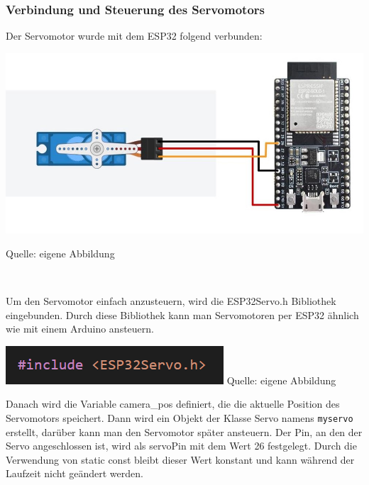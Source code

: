\documentclass[ngerman,12pt,a4paper]{article}
\begin{document}
				\subsubsection{Verbindung und Steuerung des Servomotors} %
				
				Der Servomotor wurde mit dem ESP32 folgend verbunden:
				
				\begin{center}
					\begin{minipage}[t]{\textwidth}
						\includegraphics[scale=0.6]{Pictures/servo_verkabelung}
						\label{fig:servo_verkabelung}
						\vspace{-10pt}
						\begin{center}
							\par\small Quelle: eigene Abbildung 
						\end{center}
					\end{minipage} \\[0.70cm]
				\end{center}
				
				\noindent
				Um den Servomotor einfach anzusteuern, wird die ESP32Servo.h Bibliothek eingebunden. Durch diese Bibliothek kann man Servomotoren per ESP32 ähnlich wie mit einem Arduino ansteuern.
				
				\begin{center}
					\begin{minipage}{0.7\textwidth}
						\centering
						\includegraphics[width=\textwidth]{Pictures/esp32servo}
						\label{fig:esp32sero}
						\vspace{5pt}
						{\small {Quelle: eigene Abbildung}}
					\end{minipage}
				\end{center}
				Danach wird die Variable camera\_pos definiert, die die aktuelle Position des Servomotors speichert. Dann wird ein Objekt der Klasse Servo namens \texttt{myservo} erstellt, darüber kann man den Servomotor später ansteuern. Der Pin, an den der Servo angeschlossen ist, wird als servoPin mit dem Wert 26 festgelegt. Durch die Verwendung von static const bleibt dieser Wert konstant und kann während der Laufzeit nicht geändert werden.
				
\end{document}
